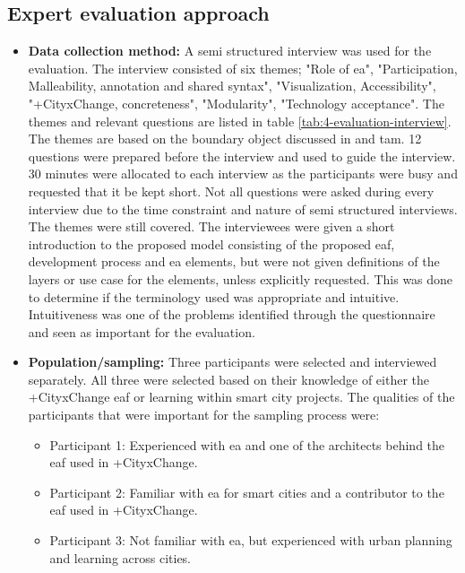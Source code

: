\subsection{Expert evaluation approach}

\begin{itemize}
    \item \textbf{Data collection method:} A semi structured interview was used for the evaluation. The interview consisted of six themes; "Role of \gls{ea}", "Participation,  Malleability, annotation and shared syntax", "Visualization, Accessibility", "+CityxChange, concreteness", "Modularity", "Technology acceptance". The themes and relevant questions are listed in table \ref{tab:4-evaluation-interview}. The themes are based on the \gls{boundary object} discussed in \cite{abraham2015crossing} and \gls{tam}. 12 questions were prepared before the interview and used to guide the interview. 30 minutes were allocated to each interview as the participants were busy and requested that it be kept short. Not all questions were asked during every interview due to the time constraint and nature of semi structured interviews. The themes were still covered. The interviewees were given a short introduction to the proposed model consisting of the proposed \gls{eaf}, development process and \gls{ea} elements, but were not given definitions of the layers or use case for the elements, unless explicitly requested. This was done to determine if the terminology used was appropriate and intuitive. Intuitiveness was one of the problems identified through the questionnaire and seen as important for the evaluation.
    \item \textbf{Population/sampling:} Three participants were selected and interviewed separately. All three were selected based on their knowledge of either the +CityxChange \gls{eaf} or learning within smart city projects.
    The qualities of the participants that were important for the sampling process were: 
    \begin{itemize}
        \item Participant 1: Experienced with \gls{ea} and one of the architects behind the \gls{eaf} used in +CityxChange.
        \item Participant 2: Familiar with \gls{ea} for smart cities and a contributor to the \gls{eaf} used in +CityxChange.
        \item Participant 3: Not familiar with \gls{ea}, but experienced with urban planning and learning across cities. 
    \end{itemize}
\end{itemize}